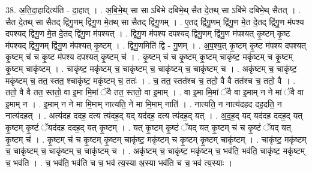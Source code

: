 \documentclass[17pt]{extarticle}
\begin{document}
38. अ॒ति॒दा॒हादित्य॑ति - दा॒हात् । . अ॒बि॒भे॒थ् सा सा ऽबि॑भे दबिभे॒थ् सैत दे॒तथ् सा ऽबि॑भे दबिभे॒थ् सैतत् । . सैत दे॒तथ् सा सैतद् द्वि॑गु॒णम् द्वि॑गु॒ण मे॒तथ् सा सैतद् द्वि॑गु॒णम् । . ए॒तद् द्वि॑गु॒णम् द्वि॑गु॒ण मे॒त दे॒तद् द्वि॑गु॒ण म॑पश्य दपश्यद् द्विगु॒ण मे॒त दे॒तद् द्वि॑गु॒ण म॑पश्यत् । . द्वि॒गु॒ण म॑पश्य दपश्यद् द्विगु॒णम् द्वि॑गु॒ण म॑पश्यत् कृ॒ष्टम् कृ॒ष्ट म॑पश्यद् द्विगु॒णम् द्वि॑गु॒ण म॑पश्यत् कृ॒ष्टम् । . द्वि॒गु॒णमिति॑ द्वि - गु॒णम् । . अ॒प॒श्य॒त् कृ॒ष्टम् कृ॒ष्ट म॑पश्य दपश्यत् कृ॒ष्टम् च॑ च कृ॒ष्ट म॑पश्य दपश्यत् कृ॒ष्टम् च॑ । . कृ॒ष्टम् च॑ च कृ॒ष्टम् कृ॒ष्टम् चाकृ॑ष्ट॒ मकृ॑ष्टम् च कृ॒ष्टम् कृ॒ष्टम् चाकृ॑ष्टम् । . चाकृ॑ष्ट॒ मकृ॑ष्टम् च॒ चाकृ॑ष्टम् च॒ चाकृ॑ष्टम् च॒ चाकृ॑ष्टम् च । . अकृ॑ष्टम् च॒ चाकृ॑ष्ट॒ मकृ॑ष्टम् च॒ तत॒ स्तत॒ श्चाकृ॑ष्ट॒ मकृ॑ष्टम् च॒ ततः॑ । . च॒ तत॒ स्तत॑श्च च॒ ततो॒ वै वै तत॑श्च च॒ ततो॒ वै । . ततो॒ वै वै तत॒ स्ततो॒ वा इ॒मा मि॒मां ॅवै तत॒ स्ततो॒ वा इ॒माम् । . वा इ॒मा मि॒मां ॅवै वा इ॒माम् न ने मां ॅवै वा इ॒माम् न । . इ॒माम् न ने मा मि॒माम् नात्यति॒ ने मा मि॒माम् नाति॑ । . नात्यति॒ न नात्य॑दहद दह॒दति॒ न नात्य॑दहत् । . अत्य॑दह ददह॒ दत्य त्य॑दह॒द् यद् यद॑दह॒ दत्य त्य॑दह॒द् यत् । . अ॒द॒ह॒द् यद् यद॑दह ददह॒द् यत् कृ॒ष्टम् कृ॒ष्टं ॅयद॑दह ददह॒द् यत् कृ॒ष्टम् । . यत् कृ॒ष्टम् कृ॒ष्टं ॅयद् यत् कृ॒ष्टम् च॑ च कृ॒ष्टं ॅयद् यत् कृ॒ष्टम् च॑ । . कृ॒ष्टम् च॑ च कृ॒ष्टम् कृ॒ष्टम् चाकृ॑ष्ट॒ मकृ॑ष्टम् च कृ॒ष्टम् कृ॒ष्टम् चाकृ॑ष्टम् । . चाकृ॑ष्ट॒ मकृ॑ष्टम् च॒ चाकृ॑ष्टम् च॒ चाकृ॑ष्टम् च॒ चाकृ॑ष्टम् च । . अकृ॑ष्टम् च॒ चाकृ॑ष्ट॒ मकृ॑ष्टम् च॒ भव॑ति॒ भव॑ति॒ चाकृ॑ष्ट॒ मकृ॑ष्टम् च॒ भव॑ति । . च॒ भव॑ति॒ भव॑ति च च॒ भव॑ त्य॒स्या अ॒स्या भव॑ति च च॒ भव॑ त्य॒स्याः । \newline
\pagebreak
{}
\end{document}
